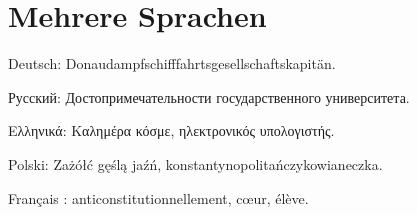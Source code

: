 \documentclass{article}
\begin{document}
\section{Mehrere Sprachen}
Deutsch: Donaudampfschifffahrtsgesellschaftskapitän.

\foreignlanguage{russian}{Русский: Достопримечательности государственного университета.}

\foreignlanguage{greek}{Ελληνικά: Καλημέρα κόσμε, ηλεκτρονικός υπολογιστής.}

\foreignlanguage{polish}{Polski: Zażółć gęślą jaźń, konstantynopolitańczykowianeczka.}

\foreignlanguage{french}{Français : anticonstitutionnellement, cœur, élève.}

\end{document}
